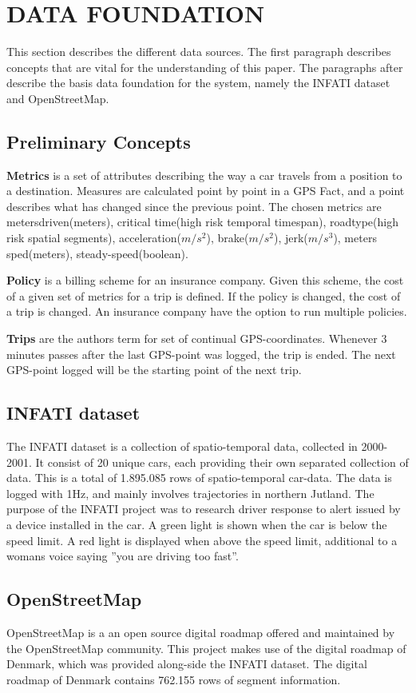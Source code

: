 \section{DATA FOUNDATION}\label{sec:datafound}

This section describes the different data sources. The first paragraph describes concepts that are vital for the understanding of this paper.
The paragraphs after describe the basis data foundation for the system, namely the INFATI dataset and OpenStreetMap.

\subsection{Preliminary Concepts}\label{subsec:precon}
\textbf{Metrics} is a set of attributes describing the way a car travels from a position  to a destination. Measures are calculated point by point in a GPS Fact, and a point describes what has changed since the previous point. The chosen metrics are metersdriven(meters), critical time(high risk temporal timespan), roadtype(high risk spatial segments), acceleration($m/s^2$), brake($m/s^2$), jerk($m/s^3$), meters sped(meters), steady-speed(boolean). 

\textbf{Policy} is a billing scheme for an insurance company. Given this scheme, the cost of a given set of metrics for a trip is defined. If the policy is changed, the cost of a trip is changed. An insurance company have the option to run multiple policies.

\textbf{Trips} are the authors term for set of continual GPS-coordinates. Whenever 3 minutes passes after the last GPS-point was logged, the trip is ended. The next GPS-point logged will be the starting point of the next trip.

\subsection{INFATI dataset}
The INFATI dataset\cite{art:INFATI} is a collection of spatio-temporal data, collected in 2000-2001. It consist of 20 unique cars, each providing their own separated collection of data. This is a total of 1.895.085 rows of spatio-temporal car-data. The data is logged with 1Hz, and mainly involves trajectories in northern Jutland. The purpose of the INFATI\cite{art:INFATI} project was to research driver response to alert issued by a device installed in the car. A green light is shown when the car is below the speed limit. A red light is displayed when above the speed limit, additional to a womans voice saying ''you are driving too fast''.

\subsection{OpenStreetMap}
OpenStreetMap\cite{osm} is a an open source digital roadmap offered  and maintained by the OpenStreetMap community. This project makes use of the digital roadmap of Denmark, which was provided along-side the INFATI dataset\cite{art:INFATI}. The digital roadmap of Denmark contains 762.155 rows of segment information.
